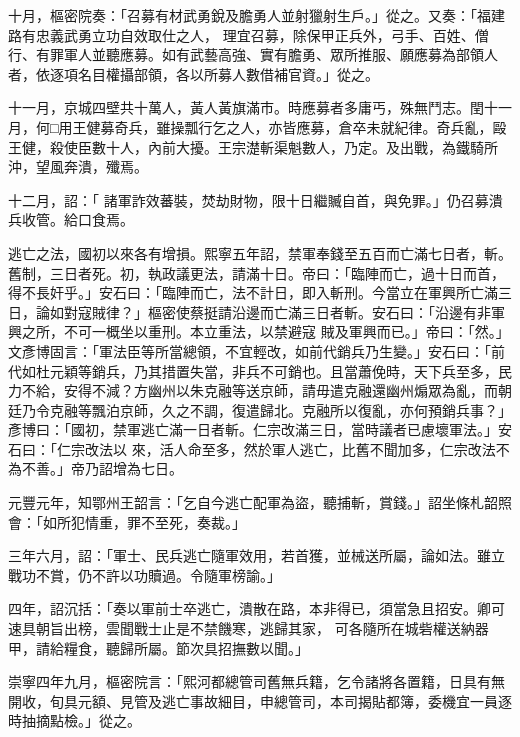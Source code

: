\begin{pinyinscope}
 十月，樞密院奏：「召募有材武勇銳及膽勇人並射獵射生戶。」從之。又奏：「福建路有忠義武勇立功自效取仕之人，
 理宜召募，除保甲正兵外，弓手、百姓、僧行、有罪軍人並聽應募。如有武藝高強、實有膽勇、眾所推服、願應募為部領人者，依逐項名目權攝部領，各以所募人數借補官資。」從之。



 十一月，京城四壁共十萬人，黃人黃旗滿市。時應募者多庸丐，殊無鬥志。閏十一月，何□用王健募奇兵，雖操瓢行乞之人，亦皆應募，倉卒未就紀律。奇兵亂，毆王健，殺使臣數十人，內前大擾。王宗濋斬渠魁數人，乃定。及出戰，為鐵騎所沖，望風奔潰，殲焉。



 十二月，詔：「
 諸軍詐效蕃裝，焚劫財物，限十日繼贓自首，與免罪。」仍召募潰兵收管。給口食焉。



 逃亡之法，國初以來各有增損。熙寧五年詔，禁軍奉錢至五百而亡滿七日者，斬。舊制，三日者死。初，執政議更法，請滿十日。帝曰：「臨陣而亡，過十日而首，得不長奸乎。」安石曰：「臨陣而亡，法不計日，即入斬刑。今當立在軍興所亡滿三日，論如對寇賊律？」樞密使蔡挺請沿邊而亡滿三日者斬。安石曰：「沿邊有非軍興之所，不可一概坐以重刑。本立重法，以禁避寇
 賊及軍興而已。」帝曰：「然。」文彥博固言：「軍法臣等所當總領，不宜輕改，如前代銷兵乃生變。」安石曰：「前代如杜元穎等銷兵，乃其措置失當，非兵不可銷也。且當蕭俛時，天下兵至多，民力不給，安得不減？方幽州以朱克融等送京師，請毋遣克融還幽州煽眾為亂，而朝廷乃令克融等飄泊京師，久之不調，復遣歸北。克融所以復亂，亦何預銷兵事？」彥博曰：「國初，禁軍逃亡滿一日者斬。仁宗改滿三日，當時議者已慮壞軍法。」安石曰：「仁宗改法以
 來，活人命至多，然於軍人逃亡，比舊不聞加多，仁宗改法不為不善。」帝乃詔增為七日。



 元豐元年，知鄂州王韶言：「乞自今逃亡配軍為盜，聽捕斬，賞錢。」詔坐條札韶照會：「如所犯情重，罪不至死，奏裁。」



 三年六月，詔：「軍士、民兵逃亡隨軍效用，若首獲，並械送所屬，論如法。雖立戰功不賞，仍不許以功贖過。令隨軍榜諭。」



 四年，詔沉括：「奏以軍前士卒逃亡，潰散在路，本非得已，須當急且招安。卿可速具朝旨出榜，雲聞戰士止是不禁饑寒，逃歸其家，
 可各隨所在城砦權送納器甲，請給糧食，聽歸所屬。節次具招撫數以聞。」



 崇寧四年九月，樞密院言：「熙河都總管司舊無兵籍，乞令諸將各置籍，日具有無開收，旬具元額、見管及逃亡事故細目，申總管司，本司揭貼都簿，委機宜一員逐時抽摘點檢。」從之。




\end{pinyinscope}
